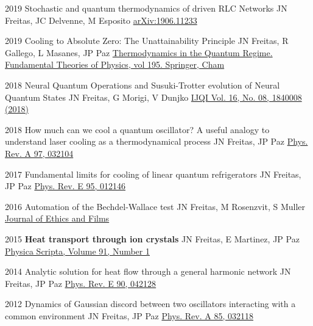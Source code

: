 

\begin{cvpubs}

\cvpub
    {2019}
    {Stochastic and quantum thermodynamics of driven RLC Networks}
    {JN Freitas, JC Delvenne, M Esposito}
    {\href{https://arxiv.org/abs/1906.11233}{arXiv:1906.11233}}

\cvpub
    {2019}
    {Cooling to Absolute Zero: The Unattainability Principle}
    {JN Freitas, R Gallego, L Masanes,  JP Paz}
    {\href{https://link.springer.com/chapter/10.1007/978-3-319-99046-0_25}{Thermodynamics in the Quantum Regime. Fundamental Theories of Physics, vol 195. Springer, Cham}}

\cvpub
    {2018}
    {Neural Quantum Operations and Susuki-Trotter evolution of Neural Quantum States}
    {JN Freitas, G Morigi, V Dunjko}
    {\href{https://www.worldscientific.com/doi/abs/10.1142/S0219749918400087}{IJQI Vol. 16, No. 08, 1840008 (2018)}}

\cvpub
    {2018}
    {How much can we cool a quantum oscillator? A useful analogy to understand laser cooling as a thermodynamical process}
    {JN Freitas, JP Paz}
    {\href{https://journals.aps.org/pra/abstract/10.1103/PhysRevA.97.032104}{Phys. Rev. A 97, 032104}}

\cvpub
    {2017}
    {Fundamental limits for cooling of linear quantum refrigerators}
    {JN Freitas, JP Paz}
    {\href{http://journals.aps.org/pre/abstract/10.1103/PhysRevE.95.012146}{Phys. Rev. E 95, 012146}}

\cvpub
    {2016}
    {Automation of the Bechdel-Wallace test}
    {JN Freitas, M Rosenzvit, S Muller}
    {\href{http://www.journal.eticaycine.org/Automation-of-the-Bechdel-Wallace}{Journal of Ethics and Films}}

\cvpub
    {2015}
    {\bf Heat transport through ion crystals}
    {JN Freitas, E Martinez, JP Paz}
    {\href{http://iopscience.iop.org/article/10.1088/0031-8949/91/1/013007/meta}{Physica Scripta, Volume 91, Number 1}}

\cvpub
    {2014}
    {Analytic solution for heat flow through a general harmonic network}
    {JN Freitas, JP Paz}
    {\href{http://journals.aps.org/pre/abstract/10.1103/PhysRevE.90.042128}{Phys. Rev. E 90, 042128}}

\cvpub
    {2012}
    {Dynamics of Gaussian discord between two oscillators interacting with a common environment}
    {JN Freitas, JP Paz}
    {\href{http://pra.aps.org/abstract/PRA/v85/i3/e032118}{Phys. Rev. A 85, 032118}}

\end{cvpubs}

